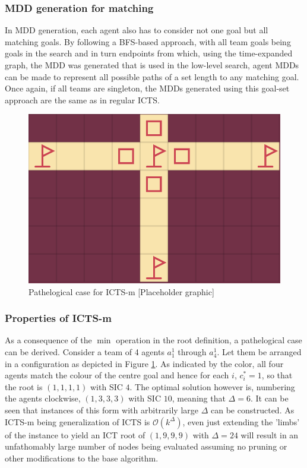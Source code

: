 \documentclass[english]{article}
\begin{document}
	\subsubsection{MDD generation for matching}
	In MDD generation, each agent also has to consider not one goal but all matching goals. By following a BFS-based approach, with all team goals being goals in the search and in turn endpoints from which, using the time-expanded graph, the MDD was generated that is used in the low-level search, agent MDDs can be made to represent all possible paths of a set length to any matching goal. Once again, if all teams are singleton, the MDDs generated using this goal-set approach are the same as in regular ICTS.
	\begin{figure}
	\centering
	\includegraphics[width=\linewidth]{img/path}
	\caption{Pathelogical case for ICTS-m [Placeholder graphic]}
	\label{fig:path}
\end{figure}
	\subsubsection{Properties of ICTS-m}
As a consequence of the $\min$ operation in the root definition, a pathelogical case can be derived. Consider a team of 4 agents $a_1^1$ through $a_4^1$. Let them be arranged in a configuration as depicted in Figure \ref{fig:path}. As indicated by the color, all four agents match the colour of the centre goal and hence for each $i$, $c^*_i = 1$, so that the root is $(1,1,1,1)$ with SIC $4$. The optimal solution however is, numbering the agents clockwise, $(1,3,3,3)$ with SIC $10$, meaning that $\Delta = 6$. It can be seen that instances of this form with arbitrarily large $\Delta$ can be constructed. As ICTS-m being generalization of ICTS is $\mathcal{O}(k^\Delta)$, even just extending the 'limbs' of the instance to yield an ICT root of $(1,9,9,9)$ with $\Delta = 24$ will result in an unfathomably large number of nodes being evaluated assuming no pruning or other modifications to the base algorithm.
\end{document}
